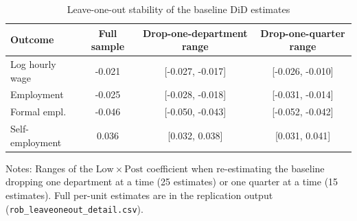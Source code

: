 \begin{table}[!tbp]\centering
\caption{Leave-one-out stability of the baseline DiD estimates}\label{tab:loo}
\begin{threeparttable}
\begin{tabular}{lccc}
\toprule
Outcome & Full sample & Drop-one-department range & Drop-one-quarter range \\
\midrule
Log hourly wage & -0.021 & [-0.027, -0.017] & [-0.026, -0.010] \\
Employment & -0.025 & [-0.028, -0.018] & [-0.031, -0.014] \\
Formal empl. & -0.046 & [-0.050, -0.043] & [-0.052, -0.042] \\
Self-employment & 0.036 & [0.032, 0.038] & [0.031, 0.041] \\
\bottomrule
\end{tabular}
\begin{tablenotes}\footnotesize
\item Notes: Ranges of the $\mathrm{Low}\times\mathrm{Post}$ coefficient when re-estimating the baseline dropping one department at a time (25 estimates) or one quarter at a time (15 estimates). Full per-unit estimates are in the replication output (\texttt{rob\_leaveoneout\_detail.csv}).
\end{tablenotes}
\end{threeparttable}\end{table}
